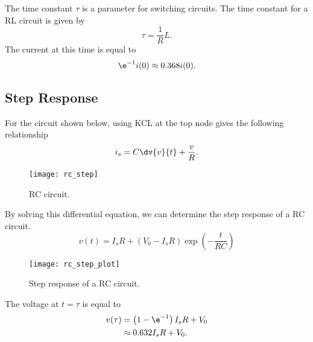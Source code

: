 \documentclass{article}
\begin{document}
\begin{definition}
    The time constant $\tau$ is a parameter for switching circuits. The time constant for a RL circuit is given by
    \begin{equation*}
        \tau = \frac{1}{R}L.
    \end{equation*}
    The current at this time is equal to
    \begin{equation*}
        \e^{-1}i(0) \approx 0.368i(0).
    \end{equation*}
\end{definition}
\subsection{Step Response}
\begin{definition}
    For the circuit shown below, using KCL at the top node gives the following relationship
    \begin{equation*}
        i_s = C\dv{v}{t} + \frac{v}{R}.
    \end{equation*}
    \begin{figure}[H]
        \centering
        \texttt{[image: rc\_step]}
        \caption{RC circuit.}
    \end{figure}
    By solving this differential equation, we can determine the step response of a
    RC circuit.
    \begin{equation*}
        v(t) = I_sR + \left(V_0 - I_sR\right) \exp{\left( -\frac{t}{RC} \right)}
    \end{equation*}
    \begin{figure}[H]
        \centering
        \texttt{[image: rc\_step\_plot]}
        \caption{Step response of a RC circuit.}
    \end{figure}
    The voltage at $t = \tau$ is equal to
    \begin{align*}
        v(\tau) & = \left(1 - \e^{-1}\right)I_sR + V_0 \\
                & \approx 0.632I_sR + V_0.
    \end{align*}
\end{definition}
\end{document}
